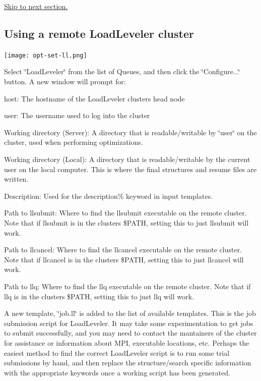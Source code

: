 \hyperlink{tut-xo_files}{Skip to next section.}\hypertarget{tut-xo_remotell}{}\subsection{Using a remote Load\+Leveler cluster}\label{tut-xo_remotell}
 
\begin{DoxyImageNoCaption}
  \mbox{\texttt{[image: opt-set-ll.png]}}
\end{DoxyImageNoCaption}


Select \char`\"{}\+Load\+Leveler\char`\"{} from the list of Queues, and then click the \char`\"{}\+Configure...\char`\"{} button. A new window will prompt for\+:
\begin{DoxyItemize}
\item host\+: The hostname of the Load\+Leveler cluster\textquotesingle{}s head node
\item user\+: The username used to log into the cluster
\item Working directory (Server)\+: A directory that is readable/writable by \char`\"{}user\char`\"{} on the cluster, used when performing optimizations.
\item Working directory (Local)\+: A directory that is readable/writable by the current user on the local computer. This is where the final structures and resume files are written.
\item Description\+: Used for the description\% keyword in input templates.
\item Path to llsubmit\+: Where to find the llsubmit executable on the remote cluster. Note that if llsubmit is in the cluster\textquotesingle{}s \$\+P\+A\+T\+H, setting this to just \textquotesingle{}llsubmit\textquotesingle{} will work.
\item Path to llcancel\+: Where to find the llcancel executable on the remote cluster. Note that if llcancel is in the cluster\textquotesingle{}s \$\+P\+A\+T\+H, setting this to just \textquotesingle{}llcancel\textquotesingle{} will work.
\item Path to llq\+: Where to find the llq executable on the remote cluster. Note that if llq is in the cluster\textquotesingle{}s \$\+P\+A\+T\+H, setting this to just \textquotesingle{}llq\textquotesingle{} will work.
\end{DoxyItemize}

A new template, \char`\"{}job.\+ll\char`\"{} is added to the list of available templates. This is the job submission script for Load\+Leveler. It may take some experimentation to get jobs to submit successfully, and you may need to contact the mantainers of the cluster for assistance or information about M\+P\+I, executable locations, etc. Perhaps the easiest method to find the correct Load\+Leveler script is to run some trial submissions by hand, and then replace the structure/search specific information with the appropriate keywords once a working script has been generated.

